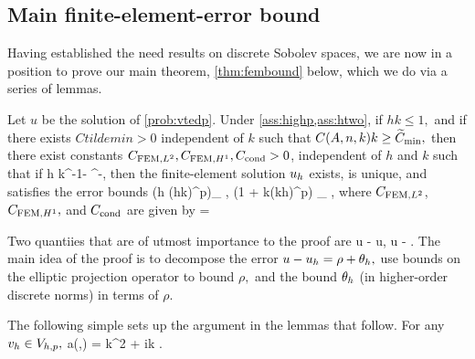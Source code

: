 \subsection{Main finite-element-error bound}\label{sec:fembound}

Having established the need results on discrete Sobolev spaces, we are now in a position to prove our main theorem, \cref{thm:fembound} below, which we do via a series of lemmas.

\label{thm:fembound}
Let $u$ be the solution of \cref{prob:vtedp}. Under \cref{ass:highp,ass:htwo}, if $hk \leq 1,$ and if there exists $Ctildemin > 0$ independent of $k$ such that $\CAnk k \geq \Ctildemin,$ then there exist constants $C_{\mathrm{FEM},L^{2}}, C_{\mathrm{FEM},H^{1}}, C_{\mathrm{cond}} > 0$, independent of $h$ and $k$ such that if
\beq\label{eq:hfemcond}
h \leq \Chcond k^{-1-} \CAnk^{-},
\eeq
then the finite-element solution $u_{h}$ exists, is unique, and satisfies the error bounds
\beqs
{} \leq \CFEMLt \mleft(h \CAnk (hk)^{p}\mright)\inf_{\vh \in \Vhp} , \tand
\eeqs
\beqs
{} \leq \CFEMHo \mleft(1 + \CAnk k(kh)^p\mright) \inf_{\vh \in \Vhp} ,
\eeqs{}
where $C_{\mathrm{FEM},L^{2}}$, $C_{\mathrm{FEM},H^{1}},$ and $C_{\mathrm{cond}}$ are given by
\beqs
\Chcond =  \min{}
\eeqs{}
\enth

Two quantiies that are of utmost importance to the proof are
\beqs
\rho \de u - \Ph u, \tand
\eeqs
\beqs
\thetah \de \Ph u - \uh.
\eeqs
The main idea of the proof is to decompose the error $u - u_{h} = \rho + \theta_{h},$ use bounds on the elliptic projection operator to bound $\rho,$ and the bound $\theta_{h}$ (in higher-order discrete norms) in terms of $\rho.$

The following simple  sets up the argument in the lemmas that follow.
\label{lem:simpleform}
For any $v_{h} \in V_{h,p},$
\beq\label{eq:thetaform}
a(\thetah,\vh) = k^2\IPLtDn{\Qhn\rho}{\vh} + ik \IPLtGI{\rho}{\vh}.
\eeq
\ele

